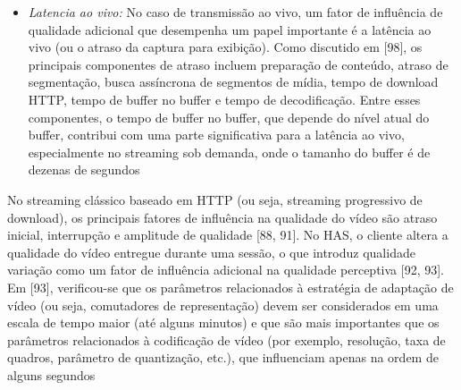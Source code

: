 \begin{itemize}
\item \textit{Latencia ao vivo:} No caso de transmissão ao vivo, um fator de influência de qualidade adicional que desempenha um papel importante é a latência ao vivo (ou o atraso da captura para exibição). Como discutido em [98], os principais componentes de atraso incluem preparação de conteúdo, atraso de segmentação, busca assíncrona de segmentos de mídia, tempo de download HTTP, tempo de buffer no buffer e tempo de decodificação. Entre esses componentes, o tempo de buffer no buffer, que depende do nível atual do buffer, contribui com uma parte significativa para a latência ao vivo, especialmente no streaming sob demanda, onde o tamanho do buffer é de dezenas de segundos

\end{itemize}

No streaming clássico baseado em HTTP (ou seja, streaming progressivo de download), os principais fatores de influência na qualidade do vídeo são atraso inicial, interrupção e amplitude de qualidade [88, 91]. No HAS, o cliente altera a qualidade do vídeo entregue durante uma sessão, o que introduz qualidade
variação como um fator de influência adicional na qualidade perceptiva [92, 93]. Em [93], verificou-se que os parâmetros relacionados à estratégia de adaptação de vídeo (ou seja, comutadores de representação) devem ser considerados em uma escala de tempo maior (até alguns minutos) e que são mais importantes que os parâmetros relacionados à codificação de vídeo (por exemplo, resolução, taxa de quadros, parâmetro de quantização, etc.), que influenciam apenas na ordem de alguns segundos